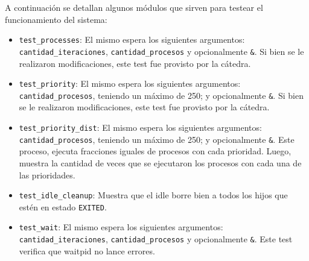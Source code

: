 \documentclass{article}
\begin{document}
A continuación se detallan algunos módulos que sirven para testear el funcionamiento del sistema:
\begin{itemize}
    \item \texttt{test\_processes}: El mismo espera los siguientes argumentos: \texttt{cantidad\_iteraciones}, \newline \texttt{cantidad\_procesos} y opcionalmente \texttt{\&}. Si bien se le realizaron modificaciones, este test fue provisto por la cátedra.
    \item \texttt{test\_priority}:  El mismo espera los siguientes argumentos: \texttt{cantidad\_procesos}, teniendo un máximo de 250; y opcionalmente \texttt{\&}. Si bien se le realizaron modificaciones, este test fue provisto por la cátedra.
    \item \texttt{test\_priority\_dist}:  El mismo espera los siguientes argumentos: \texttt{cantidad\_procesos}, teniendo un máximo de 250; y opcionalmente \texttt{\&}. Este proceso, ejecuta fracciones iguales de procesos con cada prioridad. Luego, muestra la cantidad de veces que se ejecutaron los procesos con cada una de las prioridades.
    \item \texttt{test\_idle\_cleanup}: Muestra que el idle borre bien a todos los hijos que estén en estado \texttt{EXITED}.
    \item \texttt{test\_wait}: El mismo espera los siguientes argumentos: \texttt{cantidad\_iteraciones}, \newline \texttt{cantidad\_procesos} y opcionalmente \texttt{\&}. Este test verifica que waitpid no lance errores.

\end{itemize}
\end{document}
